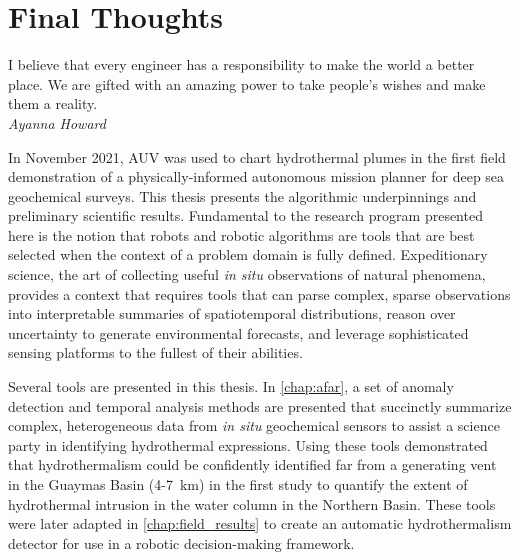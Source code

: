 \chapter{Final Thoughts}
\label{chap:conclusion}

\begin{center}
    \begin{minipage}{0.7\textwidth}
      \begin{small}
        I believe that every engineer has a responsibility to make the world a better place. We are gifted with an amazing power to take people's wishes and make them a reality.\\ \emph{Ayanna Howard}
      \end{small}
    \end{minipage}
    \vspace{0.7cm}
\end{center}


In November 2021, AUV \Sentry was used to chart hydrothermal plumes in the first field demonstration of a physically-informed autonomous mission planner for deep sea geochemical surveys.
This thesis presents the algorithmic underpinnings and preliminary scientific results.
Fundamental to the research program presented here is the notion that robots and robotic algorithms are tools that are best selected when the context of a problem domain is fully defined. Expeditionary science, the art of collecting useful \emph{in situ} observations of natural phenomena, provides a context that requires tools that can parse complex, sparse observations into interpretable summaries of spatiotemporal distributions, reason over uncertainty to generate environmental forecasts, and leverage sophisticated sensing platforms to the fullest of their abilities.

Several tools are presented in this thesis. In \cref{chap:afar}, a set of anomaly detection and temporal analysis methods are presented that succinctly summarize complex, heterogeneous data from \emph{in situ} geochemical sensors to assist a science party in identifying hydrothermal expressions. Using these tools demonstrated that hydrothermalism could be confidently identified far from a generating vent in the Guaymas Basin (4-\SI{7}{\kilo\meter}) in the first study to quantify the extent of hydrothermal intrusion in the water column in the Northern Basin. These tools were later adapted in \cref{chap:field_results} to create an automatic hydrothermalism detector for use in a robotic decision-making framework.

